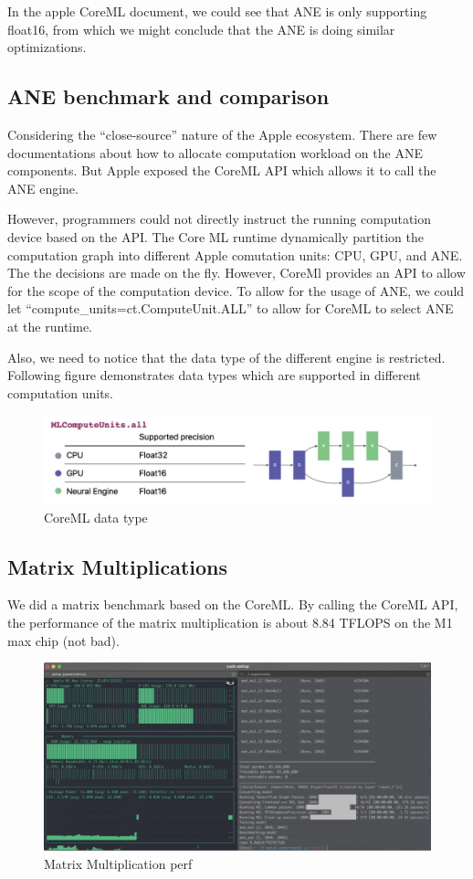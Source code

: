 \documentclass[11pt]{article}
\begin{document}
In the apple CoreML document, we could see that ANE is only supporting float16, from which we might conclude that the ANE is doing similar optimizations.

\subsection*{ANE benchmark and comparison}
Considering the “close-source” nature of the Apple ecosystem. There are few documentations about how to allocate computation workload on the ANE components. But Apple exposed the CoreML API which allows it to call the ANE engine.

However, programmers could not directly instruct the running computation device based on the API. The Core ML runtime dynamically partition the computation graph into different Apple comutation units: CPU, GPU, and ANE. The the decisions are made on the fly. However, CoreMl provides an API to allow for the scope of the computation device. To allow for the usage of ANE, we could let “compute\_units=ct.ComputeUnit.ALL” to allow for CoreML to select ANE at the runtime.

Also, we need to notice that the data type of the different engine is restricted. Following figure demonstrates data types which are supported in different computation units.

\begin{figure}[h]
    \centering
    \includegraphics[scale = 0.4]{CoreML_data_type.jpg}
    \caption{CoreML data type}
	\label{fig:CoreML data type}
\end{figure}

\subsection*{Matrix Multiplications}
We did a matrix benchmark based on the CoreML. By calling the CoreML API, the performance of the matrix multiplication is about 8.84 TFLOPS on the M1 max chip (not bad).

\begin{figure}
    \centering
    \includegraphics[scale = 0.2]{mat_mul_perf.jpg}
    \caption{Matrix Multiplication perf}
	\label{fig:Matrix Multiplication perf}
\end{figure}
\end{document}
